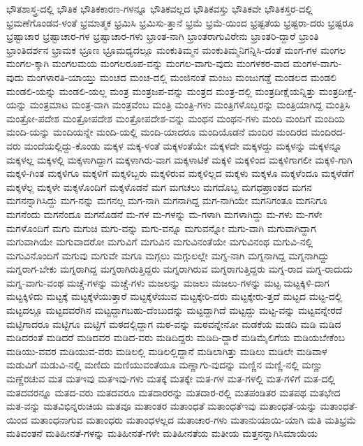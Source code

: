 {ಭೌತಶಾಸ್ತ್ರ-ದಲ್ಲಿ
ಭೌತಿಕ
ಭೌತಿಕಕಾರಣ-ಗಳನ್ನೂ
ಭೌತಿಕವಲ್ಲದ
ಭೌತಿಕವಸ್ತು
ಭೌತಿಕವೇ
ಭೌತಿಕಸ್ತರ-ದಲ್ಲಿ
ಭ್ರಮಣೆಗೊಂಡವ-ಳಂತೆ
ಭ್ರಮಾತ್ಮಕ
ಭ್ರಮಿಸಿ
ಭ್ರಮಿಸು-ತ್ತಾನೆ
ಭ್ರಮೆ
ಭ್ರಮೆ-ಯಿಂದ
ಭ್ರಷ್ಟತೆಯ
ಭ್ರಷ್ಟರಾ-ದರು
ಭ್ರಷ್ಟರೂ
ಭ್ರಷ್ಟಾಚಾರ
ಭ್ರಷ್ಟಾಚಾರ-ಗಳ
ಭ್ರಷ್ಟಾಚಾರ-ಗಳು
ಭ್ರಾಂತ-ನಾಗಿ
ಭ್ರಾಂತರಾಗುವಿರೇನು
ಭ್ರಾಂತರಿ-ದ್ದಾರೆ
ಭ್ರಾಂತಿ
ಭ್ರಾಂತಿದರ್ಶನ
ಭ್ರಾಮಕ
ಭ್ರೂಣ
ಭ್ರೂಮಧ್ಯದಲ್ಲೂ
ಮಂಕುತಿಮ್ಮನ
ಮಂಕುತಿಮ್ಮನಿಗನ್ನಿಸಿ-ದಂತೆ
ಮಂಗ-ಗಳ
ಮಂಗಲ
ಮಂಗಲ-ಕ್ಕಾಗಿ
ಮಂಗಲಮಯ
ಮಂಗಲರೂಪ-ವನ್ನು
ಮಂಗಲ-ವಾಗು-ವುದು
ಮಂಗಳಕರ-ವಾದ
ಮಂಗಳ-ವಾಗು-ವುದು
ಮಂಗಳಾರತಿ-ಯಾಯ್ತು
ಮಂಚದ
ಮಂಚ-ದಲ್ಲಿ
ಮಂಜಿನಂತೆ
ಮಂಜು
ಮಂಜುಗಡ್ಡೆ
ಮಂಡಲದ
ಮಂಡಲಿ
ಮಂಡಲಿ-ಯನ್ನು
ಮಂಡಲಿ-ಯಲ್ಲ
ಮಂತ್ರ
ಮಂತ್ರಜಪ-ವನ್ನು
ಮಂತ್ರದ
ಮಂತ್ರ-ದಲ್ಲಿ
ಮಂತ್ರದೀಕ್ಷೆಯನ್ನಿತ್ತು
ಮಂತ್ರದೀಕ್ಷೆ-ಯನ್ನು
ಮಂತ್ರಮಾಟ
ಮಂತ್ರ-ವಾಗಿ
ಮಂತ್ರವೆಂಬ
ಮಂತ್ರಿ
ಮಂತ್ರಿ-ಗಳು
ಮಂತ್ರಿಗಳೊಬ್ಬರನ್ನು
ಮಂತ್ರಿಯಾಗಿದ್ದ
ಮಂತ್ರಿಸಿ
ಮಂತ್ರೋ-ಪದೇಶ
ಮಂತ್ರೋಪದೇಶ
ಮಂತ್ರೋಪದೇಶ-ವನ್ನು
ಮಂಥನ
ಮಂಥನ-ಗಳು
ಮಂದಿ
ಮಂದಿಗೆ
ಮಂದಿಯ
ಮಂದಿ-ಯನ್ನು
ಮಂದಿಯನ್ನೇ
ಮಂದಿ-ಯಲ್ಲಿ
ಮಂದಿ-ಯಾದರೂ
ಮಂದಿಯೊಡನೆ
ಮಂದಿರ
ಮಂದಿರದ
ಮಂದಿರದ-ವರು
ಮಂದೆಯಲ್ಲಿದ್ದು-ಕೊಂಡು
ಮಕ್ಕಳ
ಮಕ್ಕ-ಳಂತೆ
ಮಕ್ಕಳಂತೆಯೇ
ಮಕ್ಕಳದೇ
ಮಕ್ಕಳದ್ದು
ಮಕ್ಕಳನ್ನು
ಮಕ್ಕಳನ್ನೂ
ಮಕ್ಕಳಲ್ಲ
ಮಕ್ಕಳಲ್ಲಿ
ಮಕ್ಕಳಾಗಿದ್ದಾಗ
ಮಕ್ಕಳಾಗಿರು-ವಾಗ
ಮಕ್ಕಳಾಟಿಕೆ
ಮಕ್ಕಳಿ
ಮಕ್ಕಳಿಂದ
ಮಕ್ಕಳಿಗಾಗಲೀ
ಮಕ್ಕಳಿ-ಗಾಗಿ
ಮಕ್ಕಳಿ-ಗಿಂತ
ಮಕ್ಕಳಿಗೂ
ಮಕ್ಕಳಿಗೆ
ಮಕ್ಕಳಿಬ್ಬರು
ಮಕ್ಕಳಿರುವ
ಮಕ್ಕಳಿಲ್ಲದ
ಮಕ್ಕಳು
ಮಕ್ಕಳೂ
ಮಕ್ಕಳೆಂದೂ
ಮಕ್ಕಳೆಡೆಗೆ
ಮಕ್ಕಳೆಲ್ಲ
ಮಕ್ಕಳೇ
ಮಕ್ಕಳೊಂದಿಗೆ
ಮಕ್ಕಳೊಡನೆ
ಮಗ
ಮಗಚಲು
ಮಗದೊಬ್ಬ
ಮಗಧಪ್ರಾಂತದ
ಮಗನ
ಮಗನನ್ನಾಗಿಸಿದ್ದು
ಮಗ-ನನ್ನು
ಮಗನಲ್ಲ
ಮಗ-ನಾಗಿ
ಮಗನಾಗಿದ್ದ
ಮಗ-ನಾಗಿಯೇ
ಮಗನಿಗಂತೂ
ಮಗನಿಗೂ
ಮಗನೆಂದು
ಮಗನೆಂದೂ
ಮಗನೊಡನೆ
ಮ-ಗಳ
ಮ-ಗಳನ್ನು
ಮ-ಗಳಾಗಿ
ಮಗಳಾಗಿದ್ದು
ಮ-ಗಳು
ಮ-ಗಳೇ
ಮಗಳೊಂದಿಗೆ
ಮಗು
ಮಗುಚಿ
ಮಗು-ವನ್ನು
ಮಗು-ವನ್ನೂ
ಮಗುವನ್ನೋ
ಮಗು-ವಾಗಿ
ಮಗುವಾಗಿದ್ದಾಗ
ಮಗುವಾಗಿಯೇ
ಮಗುವಾದರೋ
ಮಗುವಿಗೆ
ಮಗುವಿನ
ಮಗುವಿನಂತೆಯೇ
ಮಗುವಿನಂಥ
ಮಗುವಿ-ನಲ್ಲಿ
ಮಗುವಿನೊಂದಿಗೆ
ಮಗುವು
ಮಗುವೇ
ಮಗೂ
ಮಗ್ಗಲು
ಮಗ್ಗುಲಲ್ಲೇ
ಮಗ್ನ-ನಾಗಿ
ಮಗ್ನನಾಗಿದ್ದ
ಮಗ್ನನಾಗಿದ್ದು
ಮಗ್ನರಾಗ-ಬೇಕು
ಮಗ್ನರಾಗಿದ್ದ
ಮಗ್ನರಾಗಿರುತ್ತಿದ್ದರು
ಮಗ್ನರಾಗಿರುವ
ಮಗ್ನರಾಗುತ್ತಿದ್ದರು
ಮಗ್ನ-ರಾದ
ಮಗ್ನ-ರಾದುದು
ಮಗ್ನ-ವಾಗು-ವಂಥ
ಮಚ್ಚೆ-ಗಳನ್ನು
ಮಚ್ಚೆ-ಗಳು
ಮಜಲನ್ನು
ಮಜಲು
ಮಜಲು-ಗಳನ್ನು
ಮಟ್ಟ
ಮಟ್ಟಕ್ಕಿಳಿ-ದಾಗ
ಮಟ್ಟಕ್ಕಿಳಿದು
ಮಟ್ಟಕ್ಕೆ
ಮಟ್ಟಕ್ಕೆಳೆಯುತ್ತಾರೆ
ಮಟ್ಟಕ್ಕೆಳೆಯುವ
ಮಟ್ಟಕ್ಕೇರಿ-ದರು
ಮಟ್ಟಕ್ಕೇರು-ತ್ತದೆ
ಮಟ್ಟದ
ಮಟ್ಟ-ದಲ್ಲಿ
ಮಟ್ಟದಲ್ಲೂ
ಮಟ್ಟದವರೆಗಿನ
ಮಟ್ಟದ್ದಾಗಬಹು-ದೆಂಬುದನ್ನು
ಮಟ್ಟದ್ದಾಗಿದೆ
ಮಟ್ಟದ್ದು
ಮಟ್ಟ-ವನ್ನು
ಮಟ್ಟವನ್ನೇರದೆ
ಮಟ್ಟಿಗಾದರೂ
ಮಟ್ಟಿಗೂ
ಮಟ್ಟಿಗೆ
ಮಠದಲ್ಲಿದ್ದಾಗ
ಮಠ-ವನ್ನು
ಮಠವನ್ನೇನೋ
ಮಡಕೆಯ
ಮಡದಿ
ಮಡಿ
ಮಡಿದ
ಮಡಿದರಂತೆ
ಮಡಿದರೆ
ಮಡಿದವರ
ಮಡಿದ-ವರು
ಮಡಿದಿದ್ದರು
ಮಡಿದಿ-ದ್ದಾರೆ
ಮಡಿಮೈಲಿಗೆಯ
ಮಡಿಯಬೇಕೆಂಬ
ಮಡಿಯು-ವವರ
ಮಡಿಯುವ-ವರು
ಮಡಿಲಲ್ಲಿ
ಮಡಿಲಲ್ಲಿದ್ದಾನೆ
ಮಡಿಲಾಗಿತ್ತು
ಮಡಿಲು
ಮಡಿಲೇ
ಮಡಿವಾಳ
ಮಡುವಿಗೆ
ಮಡುವಿ-ನಲ್ಲಿ
ಮಣಿದು
ಮಣಿಯುವಂತೆಯೂ
ಮಣ್ಣಾಗು-ವುದನ್ನು
ಮಣ್ಣಿನ
ಮಣ್ಣಿ-ನಲ್ಲಿ
ಮಣ್ಣು
ಮಣ್ಣೆರಚುವ
ಮತ
ಮತಇವು
ಮತಇವು-ಗಳು
ಮತಕ್ಕೆ
ಮತಕ್ಕೇ
ಮತ-ಗಳ
ಮತ-ಗಳಲ್ಲಿ
ಮತ-ಗಳಿಗೆ
ಮತ-ದಲ್ಲಿ
ಮತದವರನ್ನೂ
ಮತದ-ವರು
ಮತದವರೂ
ಮತದಾರರನ್ನು
ಮತದಾರ-ರಲ್ಲಿ
ಮತಪಂಡಿತರ
ಮತಪಥ
ಮತಭೇದ
ಮತ-ವನ್ನು
ಮತವಿಭಿನ್ನರುಚಿಯ
ಮತವೂ
ಮತಾಂತರ
ಮತಾಂಧತೆ
ಮತಾಂಧತೆಇವು
ಮತಾಂಧತೆ-ಯನ್ನು
ಮತಾಂಧತೆ-ಯಿಂದ
ಮತಾಂಧನಾಗುವ
ಮತಾಂಧರು
ಮತಾಂಧಳಲ್ಲದ
ಮತಾಚಾರ-ಗಳು
ಮತಾನುಯಾಯಿ-ಯಾಗಿ
ಮತಿ
ಮತಿಭ್ರಮೆ
ಮತಿವಂತನೆ
ಮತಿಹೀನತೆ-ಗಳನ್ನು
ಮತಿಹೀನತೆ-ಗಳೇ
ಮತಿಹೀನತೆಯ
ಮತೀಯ
ಮತ್ತನನ್ನಾಗಿಸಿಮಾಯೆಯ
}

